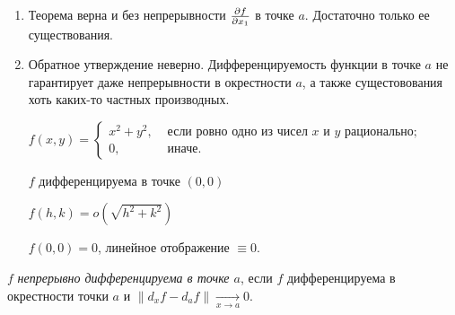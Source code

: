 \begin{remark}~
    \begin{enumerate}
        \item Теорема верна и без непрерывности $\pdv{f}{x_1}$ в точке $a$. Достаточно только ее существования.
        \item Обратное утверждение неверно. Дифференцируемость функции в точке $a$ не гарантирует даже непрерывности в окрестности $a$, а также сущестовования хоть каких-то частных производных.

        \begin{example}
            $f(x, y)=\left\{\begin{array}{ll}
                x^2 + y^2, & \text{ если ровно одно из чисел $x$ и $y$ рационально;} \\
                0, & \text{ иначе.}
            \end{array}\right.$

            $f$  дифференцируема в точке $(0, 0)$

            $f(h, k)=o(\sqrt{h^2+k^2})$

            $f(0, 0)=0$, линейное отображение $\equiv 0$.
        \end{example}
    \end{enumerate}
\end{remark}

\begin{definition}
    $f$ \textit{непрерывно дифференцируема в точке $a$}, если $f$ дифференцируема в окрестности точки $a$ и $\|d_xf-d_af\|\underset{x\rightarrow a}{\rightarrow} 0$.
\end{definition}

